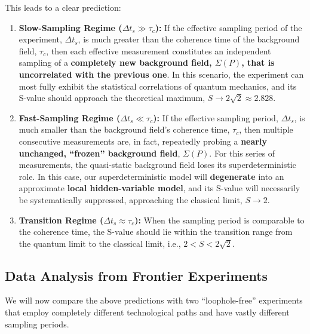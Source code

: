 \documentclass[11pt]{article}
\begin{document}
This leads to a clear prediction:

\begin{enumerate}
    \item \textbf{Slow-Sampling Regime ($\Delta t_s \gg \tau_c$):}
    If the effective sampling period of the experiment, $\Delta t_s$, is much greater than the coherence time of the background field, $\tau_c$, then each effective measurement constitutes an independent sampling of a \textbf{completely new background field, $\Sigma(P)$, that is uncorrelated with the previous one}. In this scenario, the experiment can most fully exhibit the statistical correlations of quantum mechanics, and its S-value should approach the theoretical maximum, \textbf{$S \to 2\sqrt{2} \approx 2.828$}.

    \item \textbf{Fast-Sampling Regime ($\Delta t_s \ll \tau_c$):}
    If the effective sampling period, $\Delta t_s$, is much smaller than the background field's coherence time, $\tau_c$, then multiple consecutive measurements are, in fact, repeatedly probing a \textbf{nearly unchanged, ``frozen'' background field}, $\Sigma(P)$. For this series of measurements, the quasi-static background field loses its superdeterministic role. In this case, our superdeterministic model will \textbf{degenerate} into an approximate \textbf{local hidden-variable model}, and its S-value will necessarily be systematically suppressed, approaching the classical limit, \textbf{$S \to 2$}.

    \item \textbf{Transition Regime ($\Delta t_s \approx \tau_c$):}
    When the sampling period is comparable to the coherence time, the S-value should lie within the transition range from the quantum limit to the classical limit, i.e., $2 < S < 2\sqrt{2}$.
\end{enumerate}

\subsection{Data Analysis from Frontier Experiments}

We will now compare the above predictions with two ``loophole-free'' experiments that employ completely different technological paths and have vastly different sampling periods.
\end{document}
